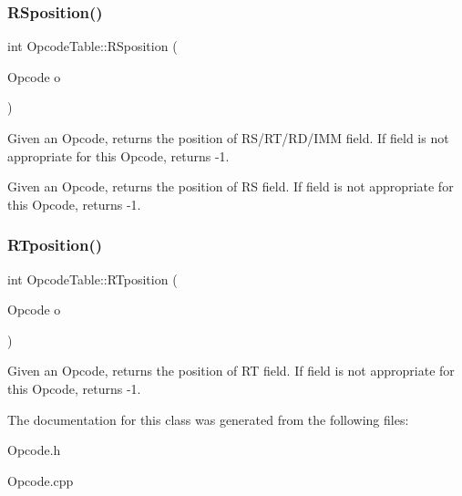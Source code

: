 \subsubsection{\texorpdfstring{R\+Sposition()}{RSposition()}}
{\footnotesize\ttfamily int Opcode\+Table\+::\+R\+Sposition (\begin{DoxyParamCaption}\item[{Opcode}]{o }\end{DoxyParamCaption})}

Given an Opcode, returns the position of R\+S/\+R\+T/\+R\+D/\+I\+MM field. If field is not appropriate for this Opcode, returns -\/1.

Given an Opcode, returns the position of RS field. If field is not appropriate for this Opcode, returns -\/1. \mbox{\label{class_opcode_table_a408f6a63857a4443a66685de636b87fd}} 
\subsubsection{\texorpdfstring{R\+Tposition()}{RTposition()}}
{\footnotesize\ttfamily int Opcode\+Table\+::\+R\+Tposition (\begin{DoxyParamCaption}\item[{Opcode}]{o }\end{DoxyParamCaption})}

Given an Opcode, returns the position of RT field. If field is not appropriate for this Opcode, returns -\/1. 

The documentation for this class was generated from the following files\+:\begin{DoxyCompactItemize}
\item 
Opcode.\+h\item 
Opcode.\+cpp\end{DoxyCompactItemize}
